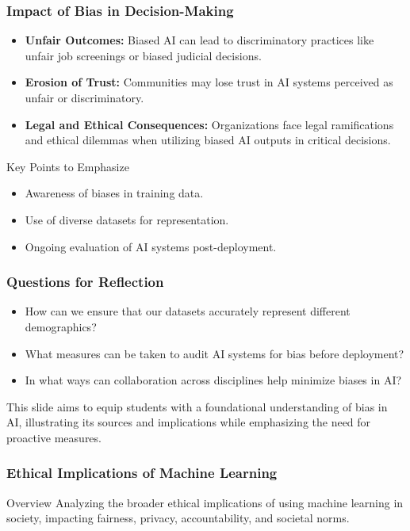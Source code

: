 \documentclass[aspectratio=169]{beamer}
\begin{document}
\begin{frame}[fragile]
  \frametitle{Impact of Bias in Decision-Making}

  \begin{itemize}
    \item \textbf{Unfair Outcomes:} Biased AI can lead to discriminatory practices like unfair job screenings or biased judicial decisions.
    \item \textbf{Erosion of Trust:} Communities may lose trust in AI systems perceived as unfair or discriminatory.
    \item \textbf{Legal and Ethical Consequences:} Organizations face legal ramifications and ethical dilemmas when utilizing biased AI outputs in critical decisions.
  \end{itemize}

  \begin{block}{Key Points to Emphasize}
    \begin{itemize}
      \item Awareness of biases in training data.
      \item Use of diverse datasets for representation.
      \item Ongoing evaluation of AI systems post-deployment.
    \end{itemize}
  \end{block}
\end{frame}

\begin{frame}[fragile]
  \frametitle{Questions for Reflection}

  \begin{itemize}
    \item How can we ensure that our datasets accurately represent different demographics?
    \item What measures can be taken to audit AI systems for bias before deployment?
    \item In what ways can collaboration across disciplines help minimize biases in AI?
  \end{itemize}

  This slide aims to equip students with a foundational understanding of bias in AI, illustrating its sources and implications while emphasizing the need for proactive measures.
\end{frame}

\begin{frame}[fragile]
    \frametitle{Ethical Implications of Machine Learning}
    \begin{block}{Overview}
        Analyzing the broader ethical implications of using machine learning in society, impacting fairness, privacy, accountability, and societal norms.
    \end{block}
\end{frame}
\end{document}
